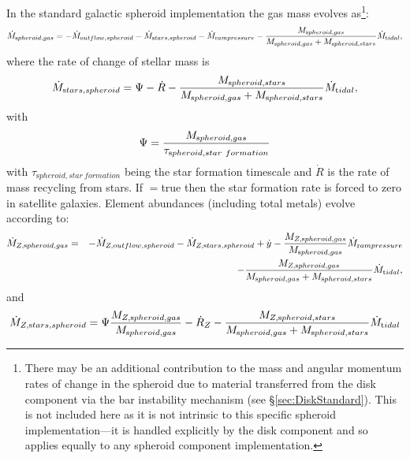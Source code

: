 In the standard galactic spheroid implementation the gas mass evolves as\footnote{There may be an additional contribution to the mass and angular momentum rates of change in the spheroid due to material transferred from the disk \gls{component} via the bar instability mechanism (see \S\protect\ref{sec:DiskStandard}). This is not included here as it is not intrinsic to this specific spheroid implementation---it is handled explicitly by the disk \gls{component} and so applies equally to any spheroid \gls{component} implementation.}:
\begin{equation}
 \dot{M}_{\mathrm spheroid, gas} = - \dot{M}_{\mathrm outflow, spheroid} - \dot{M}_{\mathrm stars, spheroid} - \dot{M}_{\mathrm ram pressure} - {M_{\mathrm spheroid, gas} \over M_{\mathrm spheroid, gas} + M_{\mathrm spheroid, stars}} \dot{M}_{\mathrm tidal},
\end{equation}
where the rate of change of stellar mass is
\begin{equation}
 \dot{M}_{\mathrm stars, spheroid} = \Psi - \dot{R} - {M_{\mathrm spheroid, stars} \over M_{\mathrm spheroid, gas} + M_{\mathrm spheroid, stars}} \dot{M}_{\mathrm tidal},
\end{equation}
with
\begin{equation}
 \Psi = {M_{\mathrm spheroid, gas} \over \tau_{\mathrm spheroid, star~formation}}
\end{equation}
with $\tau_{\mathrm spheroid, star~formation}$ being the star formation timescale and $\dot{R}$ is the rate of mass recycling from stars. If {\normalfont \ttfamily [spheroidStarFormationInSatellites]}$=${\normalfont \ttfamily true} then the star formation rate is forced to zero in satellite galaxies. Element abundances (including total metals) evolve according to:
\begin{eqnarray}
  \dot{M}_{Z, {\mathrm spheroid, gas}} &=& - \dot{M}_{Z, {\mathrm outflow, spheroid}} - \dot{M}_{Z, {\mathrm stars, spheroid}} + \dot{y} - {M_{Z, {\mathrm spheroid, gas}} \over M_{\mathrm spheroid, gas}} \dot{M}_{\mathrm ram pressure} \nonumber \\ 
 & & - {M_{Z, {\mathrm spheroid, gas}} \over M_{\mathrm spheroid, gas} + M_{\mathrm spheroid, stars}} \dot{M}_{\mathrm tidal},
\end{eqnarray}
and
\begin{equation}
 \dot{M}_{Z, {\mathrm stars, spheroid}} = \Psi {M_{Z, {\mathrm spheroid, gas}} \over M_{\mathrm spheroid, gas}} - \dot{R}_Z - {M_{Z, {\mathrm spheroid, stars}} \over M_{\mathrm spheroid, gas} + M_{\mathrm spheroid, stars}} \dot{M}_{\mathrm tidal}
\end{equation}
